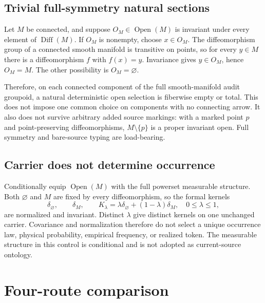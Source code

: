 \documentclass[11pt]{article}
\newcommand{\Open}{\operatorname{Open}}
\newcommand{\Diff}{\operatorname{Diff}}
\begin{document}
\subsection{Trivial full-symmetry natural sections}

Let \(M\) be connected, and suppose \(O_M\in\Open(M)\) is invariant under
every element of \(\Diff(M)\). If \(O_M\) is nonempty, choose
\(x\in O_M\). The diffeomorphism group of a connected smooth manifold is
transitive on points, so for every \(y\in M\) there is a diffeomorphism
\(f\) with \(f(x)=y\). Invariance gives \(y\in O_M\), hence \(O_M=M\).
The other possibility is \(O_M=\varnothing\).

Therefore, on each connected component of the full smooth-manifold audit
groupoid, a natural deterministic open selection is fiberwise empty or total.
This does not impose one common choice on components with no connecting arrow.
It also does not survive arbitrary added source markings: with a marked point
\(p\) and point-preserving diffeomorphisms, \(M\setminus\{p\}\) is a proper
invariant open. Full symmetry and bare-source typing are load-bearing.

\subsection{Carrier does not determine occurrence}

Conditionally equip \(\Open(M)\) with the full powerset measurable
structure. Both \(\varnothing\) and \(M\) are fixed by every diffeomorphism,
so the formal kernels
\begin{equation}
 \delta_{\varnothing},\qquad \delta_M,\qquad
 K_\lambda=\lambda\delta_{\varnothing}+(1-\lambda)\delta_M,
 \quad 0\leq\lambda\leq1,
 \label{eq:kernels}
\end{equation}
are normalized and invariant. Distinct \(\lambda\) give distinct kernels on
one unchanged carrier. Covariance and normalization therefore do not select a
unique occurrence law, physical probability, empirical frequency, or realized
token. The measurable structure in this control is conditional and is not
adopted as current-source ontology.

\section{Four-route comparison}
\end{document}
